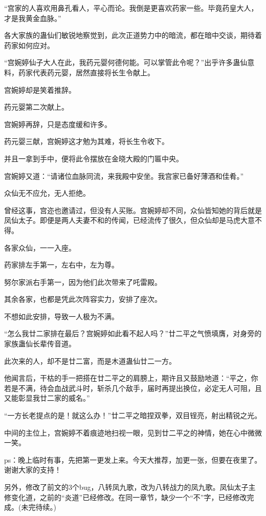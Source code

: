 \begin{this_body}
“宫家的人喜欢用鼻孔看人，平心而论。我倒是更喜欢药家一些。毕竟药皇大人，才是我黄金血脉。”

各大家族的蛊仙们敏锐地察觉到，此次正道势力中的暗流，都在暗中交谈，期待着药家如何应对。

“宫婉婷仙子大人在此，我药元婴何德何能。可以掌管此令呢？”出乎许多蛊仙意料，药家代表药元婴，居然直接将长生令献上。

宫婉婷却是笑着推辞。

药元婴第二次献上。

宫婉婷再辞，只是态度缓和许多。

药元婴三献，宫婉婷这才勉为其难，将长生令收下。

并且一拿到手中，便将此令摆放在金晓大殿的门匾中央。

宫婉婷又道：“请诸位血脉同流，来我殿中安坐。我宫家已备好薄酒和佳肴。”

众仙无不应允，无人拒绝。

曾经这事，宫迩也邀请过，但没有人买账。宫婉婷却不同，众仙皆知她的背后就是凤仙太子。即便是两人夫妻不和的传闻，已经流传了很久，但众仙却是马虎大意不得。

各家众仙，一一入座。

药家排左手第一，左右中，左为尊。

努尔家派右手第一，因为他们此次带来了吒雷殿。

其余各家，也都是凭此次阵容实力，安排了座次。

不想如此安排，导致一人极为不满。

“怎么我廿二家排在最后？宫婉婷如此看不起人吗？”廿二平之气愤填膺，对身旁的家族蛊仙长辈传音道。

此次来的人，却不是廿二富，而是木道蛊仙廿二一方。

他闻言后，干枯的手一把搭在廿二平之的肩膀上，期许且又鼓励地道：“平之，你若是不满，待会血战武斗时，斩杀几个敌手，届时再提出换位，必定无人可阻，且又能彰显我廿二家的威名。”

“一方长老提点的是！就这么办！”廿二平之暗捏双拳，双目锃亮，射出精锐之光。

中间的主位上，宫婉婷不着痕迹地扫视一眼，见到廿二平之的神情，她在心中微微一笑。

ps：晚上临时有事，先把第一更发上来。今天大推荐，加更一张，但要在夜里了。谢谢大家的支持！

另外，修改了前文的3个bug，八转凤九歌，改为八转战力的凤九歌。凤仙太子主修变化道，之前的“炎道”已经修改。在同一章节，缺少一个“不”字，已经修改完成。(未完待续。)

\end{this_body}

